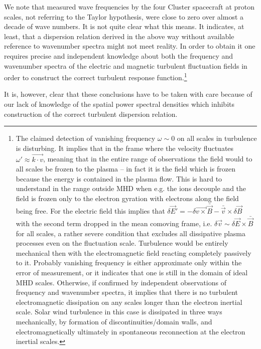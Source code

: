 \documentclass[ ]{copernicus2}
\begin{document}
{{{{We note that measured wave frequencies by the four Cluster spacecraft at proton scales, not referring to the Taylor hypothesis,  were close to zero over almost a decade of wave numbers. It is not quite clear what this means. It indicates, at least, that a dispersion relation derived in the above way without available reference to wavenumber spectra might not meet reality. In order to obtain it one requires precise and independent knowledge about both the frequency and wavenumber spectra of the electric and magnetic turbulent fluctuation fields in order to construct the correct turbulent response function.}\footnote{The claimed detection of vanishing frequency $\omega\sim 0$ on all scales in turbulence is disturbing. It implies that in the frame where the velocity fluctuates $\omega'\approx \vec{k\cdot v}$, meaning that in the entire range of observations the field would to all scales be frozen to the plasma -- in fact it is the field which is frozen because the energy is contained in the plasma flow. This is hard to understand in the range outside MHD when e.g. the ions decouple and the field is frozen only to the electron gyration with electrons along the field being free. For the electric field this implies that $\delta\vec{E}'=-\delta\vec{v\times}\bar{\vec{B}}-\bar{\vec{v}}\times\delta\vec{B}$ with the second term dropped in the mean comoving frame, i.e. $\delta\vec{v}\sim\delta\vec{E}\times\bar{\vec{B}}$ for all scales, a rather severe condition that excludes all dissipative plasma processes even on the fluctuation scale. Turbulence would be entirely mechanical then with the electromagnetic field reacting completely passively to it. Probably vanishing frequency is either approximate only within the error of measurement, or it indicates that one is still in the domain of ideal MHD scales. Otherwise, if confirmed by independent observations of frequency and wavenumber spectra, it implies that there is no turbulent electromagnetic dissipation on any scales longer than the electron inertial scale. Solar wind turbulence in this case is dissipated in three ways mechanically, by formation of discontinuities/domain walls, and electromagnetically ultimately in spontaneous reconnection at the electron inertial scales.}

{It is, however, clear that these conclusions have to be taken with care because of our lack of knowledge of the spatial power  spectral densities which inhibits construction of the correct turbulent dispersion relation.}



}}}
\end{document}
